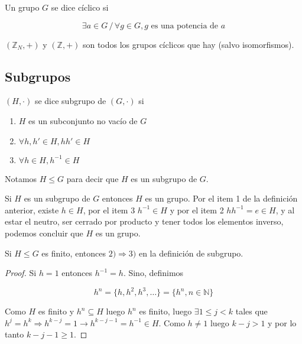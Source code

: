 \begin{defn}
Un grupo $G$ se dice c\'iclico si 

$$\exists a \in G \, / \, \forall g \in G, g\textrm{ es una potencia de }a$$
\end{defn}

$(\mathbb{Z}_N,+)$ y $(\mathbb{Z},+)$ son todos los grupos c\'iclicos que hay (salvo isomorfismos).

\subsection{Subgrupos}

\begin{defn}
$(H,\cdot)$ se dice subgrupo de $(G,\cdot)$ si

\begin{enumerate}
\item $H$ es un subconjunto no vac\'io de $G$
\item $\forall h, h' \in H, hh' \in H$
\item $\forall h \in H, h^{-1} \in H$
\end{enumerate}

Notamos $H \leq G$ para decir que $H$ es un subgrupo de $G$.
\end{defn}

\begin{obs}
Si $H$ es un subgrupo de $G$ entonces $H$ es un grupo. Por el item 1 de la definici\'on anterior, existe $h \in H$, por el item 3 $h^{-1} \in H$ y por el item 2 $hh^{-1} = e \in H$, y al estar el neutro, ser cerrado por producto y tener todos los elementos inverso, podemos concluir que $H$ es un grupo.
\end{obs}

\begin{prop}
Si $H \leq G$ es finito, entonces $2) \Rightarrow 3)$ en la definici\'on de subgrupo.
\end{prop}

\begin{proof}
Si $h = 1$ entonces $h^{-1} = h$. Sino, definimos 

$$h^n = \{h,h^2,h^3, \dots\} = \{h^n, n \in \mathbb{N}\}$$

Como $H$ es finito y $h^n \subseteq H$ luego $h^n$ es finito, luego $\exists 1 \leq j < k$ tales que $h^j = h^k \Rightarrow h^{k-j} = 1 \rightarrow h^{k-j-1} = h^{-1} \in H$. Como $h \neq 1$ luego $k-j > 1$ y por lo tanto $k-j-1 \geq 1$.
\end{proof}

